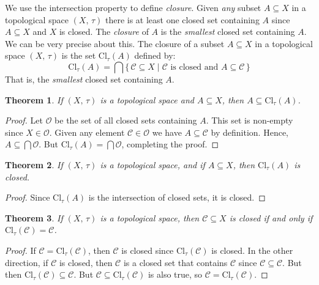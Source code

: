 \documentclass{article}
\theoremstyle{plain}
\newtheorem{theorem}{Theorem}[section]
\theoremstyle{normal}
\newenvironment{definition}{%
    \pushQED{\qed}\renewcommand{\qedsymbol}{$\blacksquare$}\definitionx%
}{%
    \popQED\enddefinitionx%
}
\begin{document}
        We use the intersection property to define \textit{closure}. Given
        \textit{any} subset $A\subseteq{X}$ in a topological space $(X,\,\tau)$
        there is at least one closed set containing $A$ since
        $A\subseteq{X}$ and $X$ is closed. The \textit{closure} of $A$ is the
        \textit{smallest} closed set containing $A$. We can be very precise
        about this.
        \begin{definition}[\textbf{Closure of a Set}]
            The closure of a subset $A\subseteq{X}$ in a topological space
            $(X,\,\tau)$ is the set $\textrm{Cl}_{\tau}(A)$ defined by:
            \begin{equation}
                \textrm{Cl}_{\tau}(A)=\bigcap\{\,\mathcal{C}\subseteq{X}\;|\;
                    \mathcal{C}\textrm{ is closed and }A\subseteq\mathcal{C}\,\}
            \end{equation}
            That is, the \textit{smallest} closed set containing $A$.
        \end{definition}
        \begin{theorem}
            If $(X,\,\tau)$ is a topological space and $A\subseteq{X}$, then
            $A\subseteq\textrm{Cl}_{\tau}(A)$.
        \end{theorem}
        \begin{proof}
            Let $\mathcal{O}$ be the set of all closed sets containing $A$.
            This set is non-empty since $X\in\mathcal{O}$. Given any element
            $\mathcal{C}\in\mathcal{O}$ we have $A\subseteq\mathcal{C}$ by
            definition. Hence, $A\subseteq\bigcap\mathcal{O}$. But
            $\textrm{Cl}_{\tau}(A)=\bigcap\mathcal{O}$, completing the proof.
        \end{proof}
        \begin{theorem}
            If $(X,\,\tau)$ is a topological space, and if $A\subseteq{X}$,
            then $\textrm{Cl}_{\tau}(A)$ is closed.
        \end{theorem}
        \begin{proof}
            Since $\textrm{Cl}_{\tau}(A)$ is the intersection of closed sets,
            it is closed.
        \end{proof}
        \begin{theorem}
            If $(X,\,\tau)$ is a topological space, then
            $\mathcal{C}\subseteq{X}$ is closed if and only if
            $\textrm{Cl}_{\tau}(\mathcal{C})=\mathcal{C}$.
        \end{theorem}
        \begin{proof}
            If $\mathcal{C}=\textrm{Cl}_{\tau}(\mathcal{C})$, then
            $\mathcal{C}$ is closed since $\textrm{Cl}_{\tau}(\mathcal{C})$ is
            closed. In the other direction, if
            $\mathcal{C}$ is closed, then $\mathcal{C}$ is a closed set that
            contains $\mathcal{C}$ since $\mathcal{C}\subseteq\mathcal{C}$. But
            then $\textrm{Cl}_{\tau}(\mathcal{C})\subseteq\mathcal{C}$. But
            $\mathcal{C}\subseteq\textrm{Cl}_{\tau}(\mathcal{C})$ is also true,
            so $\mathcal{C}=\textrm{Cl}_{\tau}(\mathcal{C})$.
        \end{proof}
\end{document}
